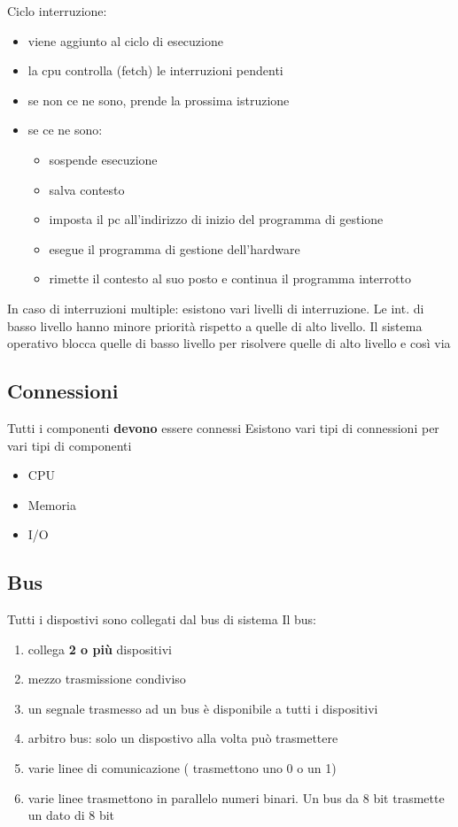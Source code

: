\documentclass[12pt, a4paper]{article}
\begin{document}
Ciclo interruzione:
\begin{itemize}
	\item viene aggiunto al ciclo di esecuzione
	\item la cpu controlla (fetch) le interruzioni pendenti
	\item se non ce ne sono, prende la prossima istruzione
	\item se ce ne sono: 
	\begin{itemize}
		\item sospende esecuzione
		\item salva contesto
		\item imposta il pc all'indirizzo di inizio del programma di gestione
		\item esegue il programma di gestione dell'hardware
		\item rimette il contesto al suo posto e continua il programma interrotto
	\end{itemize}
\end{itemize}
In caso di interruzioni multiple: esistono vari livelli di interruzione. Le int. di basso livello hanno minore priorità rispetto a quelle di alto livello. 
Il sistema operativo blocca quelle di basso livello per risolvere quelle di alto livello e così via
\subsection{Connessioni}
Tutti i componenti \textbf{devono} essere connessi \newline
Esistono vari tipi di connessioni per vari tipi di componenti
\begin{itemize}
	\item CPU
	\item Memoria 
	\item I/O
\end{itemize}

\subsection{Bus}
Tutti i dispostivi sono collegati dal bus di sistema \newline
Il bus:
\begin{enumerate}
	\item collega \textbf{2 o più} dispositivi
	\item mezzo trasmissione condiviso
	\item un segnale trasmesso ad un bus è disponibile a tutti i dispositivi
	\item arbitro bus: solo un dispostivo alla volta può trasmettere
	\item varie linee di comunicazione ( trasmettono uno 0 o un 1)
	\item varie linee trasmettono in parallelo numeri binari. Un bus da 8 bit trasmette un dato di 8 bit
\end{enumerate}
\end{document}
